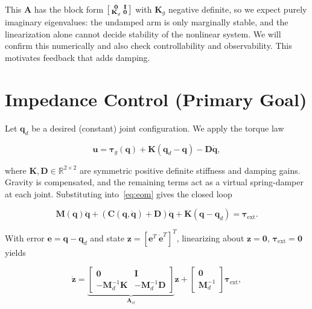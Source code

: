 \documentclass[letterpaper, 10pt, conference]{ieeeconf}
\begin{document}
This $\mathbf{A}$ has the block form
$\begin{bsmallmatrix}\mathbf{0}&\mathbf{I}\\
\mathbf{K}_g&\mathbf{0}\end{bsmallmatrix}$ with
$\mathbf{K}_g$ negative definite, so we expect purely
imaginary eigenvalues: the undamped arm is only
marginally stable, and the linearization alone cannot
decide stability of the nonlinear system. We will
confirm this numerically and also check
controllability and observability. This motivates
feedback that adds damping.

\section{Impedance Control (Primary Goal)}

Let $\mathbf{q}_d$ be a desired (constant) joint
configuration. We apply the torque law

\begin{equation}
\boxed{
\mathbf{u} =
\boldsymbol{\tau}_g(\mathbf{q})
+\mathbf{K}(\mathbf{q}_d-\mathbf{q})
-\mathbf{D}\dot{\mathbf{q}},
}
\label{eq:impedance}
\end{equation}

where $\mathbf{K},\mathbf{D}\in\mathbb{R}^{2\times2}$
are symmetric positive definite stiffness and damping
gains. Gravity is compensated, and the remaining
terms act as a virtual spring-damper at each joint.
Substituting into~\eqref{eq:eom} gives the closed
loop

\[
\mathbf{M}(\mathbf{q})\ddot{\mathbf{q}}
+\left(\mathbf{C}(\mathbf{q},\dot{\mathbf{q}})
+\mathbf{D}\right)\dot{\mathbf{q}}
+\mathbf{K}(\mathbf{q}-\mathbf{q}_d)
=\boldsymbol{\tau}_{\mathrm{ext}}.
\]

With error $\mathbf{e}=\mathbf{q}-\mathbf{q}_d$ and
state $\mathbf{z}=[\mathbf{e}^{T}\ \dot{\mathbf{e}}^{T}]^{T}$,
linearizing about $\mathbf{z}=\mathbf{0}$,
$\boldsymbol{\tau}_{\mathrm{ext}}=\mathbf{0}$ yields

\begin{equation}
\dot{\mathbf{z}} =
\underbrace{\begin{bmatrix}
\mathbf{0} & \mathbf{I}\\
-\mathbf{M}_d^{-1}\mathbf{K} & -\mathbf{M}_d^{-1}\mathbf{D}
\end{bmatrix}}_{\mathbf{A}_{cl}}\mathbf{z}
+
\begin{bmatrix}
\mathbf{0}\\ \mathbf{M}_d^{-1}
\end{bmatrix}\boldsymbol{\tau}_{\mathrm{ext}},
\label{eq:closed_loop}
\end{equation}
\end{document}
